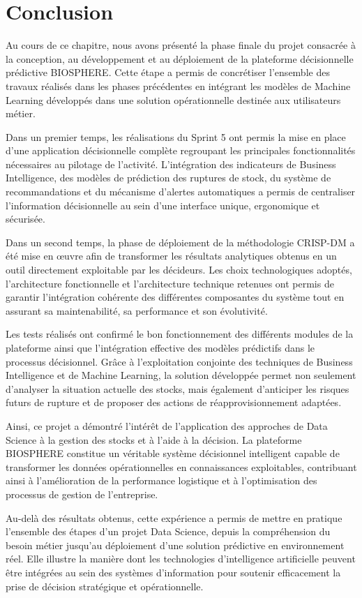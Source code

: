 \section{Conclusion}

Au cours de ce chapitre, nous avons présenté la phase finale du projet consacrée à la conception, au développement et au déploiement de la plateforme décisionnelle prédictive BIOSPHERE. Cette étape a permis de concrétiser l'ensemble des travaux réalisés dans les phases précédentes en intégrant les modèles de Machine Learning développés dans une solution opérationnelle destinée aux utilisateurs métier.

Dans un premier temps, les réalisations du Sprint 5 ont permis la mise en place d'une application décisionnelle complète regroupant les principales fonctionnalités nécessaires au pilotage de l'activité. L'intégration des indicateurs de Business Intelligence, des modèles de prédiction des ruptures de stock, du système de recommandations et du mécanisme d'alertes automatiques a permis de centraliser l'information décisionnelle au sein d'une interface unique, ergonomique et sécurisée.

Dans un second temps, la phase de déploiement de la méthodologie CRISP-DM a été mise en œuvre afin de transformer les résultats analytiques obtenus en un outil directement exploitable par les décideurs. Les choix technologiques adoptés, l'architecture fonctionnelle et l'architecture technique retenues ont permis de garantir l'intégration cohérente des différentes composantes du système tout en assurant sa maintenabilité, sa performance et son évolutivité.

Les tests réalisés ont confirmé le bon fonctionnement des différents modules de la plateforme ainsi que l'intégration effective des modèles prédictifs dans le processus décisionnel. Grâce à l'exploitation conjointe des techniques de Business Intelligence et de Machine Learning, la solution développée permet non seulement d'analyser la situation actuelle des stocks, mais également d'anticiper les risques futurs de rupture et de proposer des actions de réapprovisionnement adaptées.

Ainsi, ce projet a démontré l'intérêt de l'application des approches de Data Science à la gestion des stocks et à l'aide à la décision. La plateforme BIOSPHERE constitue un véritable système décisionnel intelligent capable de transformer les données opérationnelles en connaissances exploitables, contribuant ainsi à l'amélioration de la performance logistique et à l'optimisation des processus de gestion de l'entreprise.

Au-delà des résultats obtenus, cette expérience a permis de mettre en pratique l'ensemble des étapes d'un projet Data Science, depuis la compréhension du besoin métier jusqu'au déploiement d'une solution prédictive en environnement réel. Elle illustre la manière dont les technologies d'intelligence artificielle peuvent être intégrées au sein des systèmes d'information pour soutenir efficacement la prise de décision stratégique et opérationnelle.

